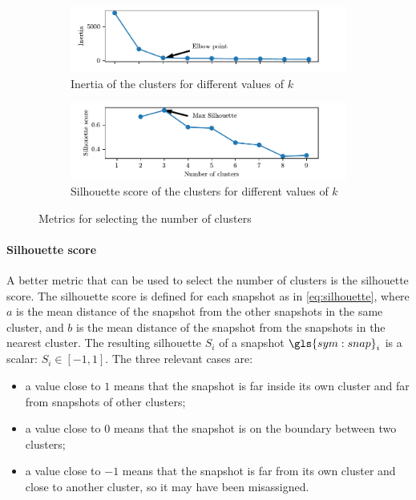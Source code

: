 \begin{figure}
  \begin{subfigure}{\textwidth}
    \includegraphics[width=\textwidth]{images/Kmeans_inertia.pdf}
    \caption{Inertia of the clusters for different values of $k$}
    \label{fig:kmeans_inertia}
  \end{subfigure}
  \begin{subfigure}{\textwidth}
    \includegraphics[width=\textwidth]{images/Kmeans_silhouette.pdf}
    \caption{Silhouette score of the clusters for different values of $k$}
    \label{fig:kmeans_silhouette}
  \end{subfigure}
  \label{fig:kmeans_metrics}
  \caption{Metrics for selecting the number of clusters}
\end{figure}

\paragraph*{Silhouette score}
A better metric that can be used to select the number of clusters is the silhouette score.
The silhouette score is defined for each snapshot as in \autoref{eq:silhouette}, where $a$ is the mean distance of the snapshot from the other snapshots in the same cluster, and $b$ is the mean distance of the snapshot from the snapshots in the nearest cluster. The resulting silhouette $S_i$ of a snapshot $\gls{sym:snap}_i$ is a scalar: $S_i \in [-1,1]$.
The three relevant cases are:
\begin{itemize}
  \item a value close to $1$ means that the snapshot is far inside its own cluster and far from snapshots of other clusters;
  \item a value close to $0$ means that the snapshot is on the boundary between two clusters;
  \item a value close to $-1$ means that the snapshot is far from its own cluster and close to another cluster, so it may have been misassigned.
\end{itemize}

